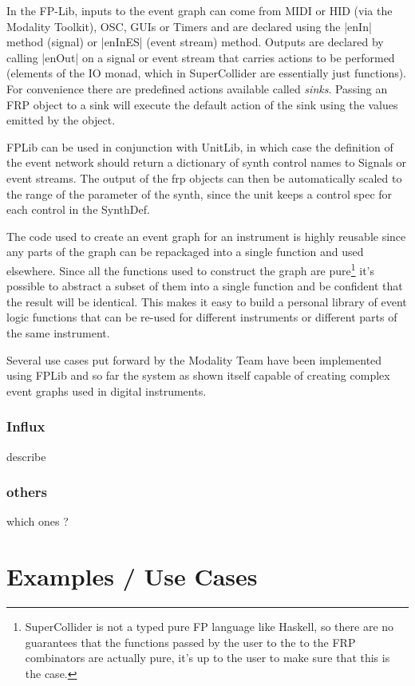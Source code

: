 \documentclass{article}
\begin{document}
In the FP-Lib, inputs to the event graph can come from MIDI or HID (via the
Modality Toolkit), OSC, GUIs or Timers and are declared using  the |enIn| method (signal) or |enInES| (event stream) method. Outputs are declared by calling |enOut| on a signal or event stream that carries actions to be performed (elements of the IO monad, which in SuperCollider are essentially just functions). For convenience there are predefined actions available called \textit{sinks}. Passing an FRP object to a sink will execute the default action of the sink using the values emitted by the object.

FPLib can be used in conjunction with UnitLib, in which case the definition of the event network should return a dictionary of synth control names to Signals or event streams. The output of the frp objects can then be automatically scaled to the range of the parameter of the synth, since the unit keeps a control spec for each control in the SynthDef.

The code used to create an event graph for an instrument is highly reusable since any parts of the graph can be repackaged into a single function and used elsewhere. Since all the functions used to construct the graph are pure\footnote{SuperCollider is not a typed pure FP language like Haskell, so there are no guarantees that the functions passed by the user to the to the FRP combinators are actually pure, it's up to the user to make sure that this is the case.} it's possible to abstract a subset of them into a single function and be confident that the result will be identical. This makes it easy to build a personal library of event logic functions that can be re-used for different instruments or different parts of the same instrument.

Several use cases put forward by the Modality Team have been implemented using FPLib and so far the system as shown itself capable of creating complex event graphs used in digital instruments.

\subsubsection{Influx}

describe

\subsubsection{others}

which ones ?

\section{Examples / Use Cases}
\label{sec:examples_use_cases}
\end{document}
